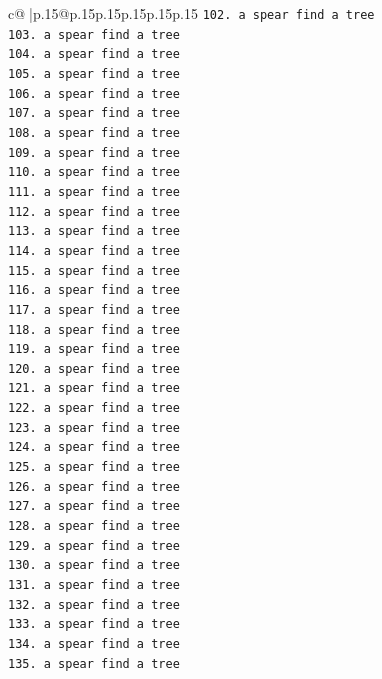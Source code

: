 \documentclass{article}
\begin{document}
{\begin{supertabular}{c@{$\;$}|p{.15\linewidth}@{}p{.15\linewidth}p{.15\linewidth}p{.15\linewidth}p{.15\linewidth}p{.15\linewidth}}
{{{\texttt{102. a spear find a tree} \\
\texttt{103. a spear find a tree} \\
\texttt{104. a spear find a tree} \\
\texttt{105. a spear find a tree} \\
\texttt{106. a spear find a tree} \\
\texttt{107. a spear find a tree} \\
\texttt{108. a spear find a tree} \\
\texttt{109. a spear find a tree} \\
\texttt{110. a spear find a tree} \\
\texttt{111. a spear find a tree} \\
\texttt{112. a spear find a tree} \\
\texttt{113. a spear find a tree} \\
\texttt{114. a spear find a tree} \\
\texttt{115. a spear find a tree} \\
\texttt{116. a spear find a tree} \\
\texttt{117. a spear find a tree} \\
\texttt{118. a spear find a tree} \\
\texttt{119. a spear find a tree} \\
\texttt{120. a spear find a tree} \\
\texttt{121. a spear find a tree} \\
\texttt{122. a spear find a tree} \\
\texttt{123. a spear find a tree} \\
\texttt{124. a spear find a tree} \\
\texttt{125. a spear find a tree} \\
\texttt{126. a spear find a tree} \\
\texttt{127. a spear find a tree} \\
\texttt{128. a spear find a tree} \\
\texttt{129. a spear find a tree} \\
\texttt{130. a spear find a tree} \\
\texttt{131. a spear find a tree} \\
\texttt{132. a spear find a tree} \\
\texttt{133. a spear find a tree} \\
\texttt{134. a spear find a tree} \\
\texttt{135. a spear find a tree} \\
}}}
\end{supertabular}}
\end{document}
